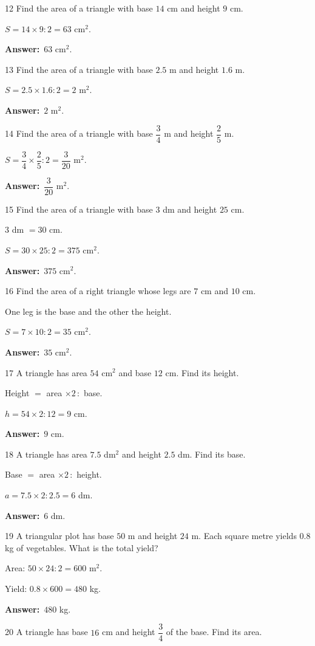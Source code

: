 \documentclass[11pt]{article}
\newif\ifsol \solfalse
\providecommand{\AnsWord}{Đáp số}
\newcommand{\dapso}[1]{\par\textbf{\AnsWord:}\ #1}
\newcommand{\probsol}[1]{%
  \begin{lrbox}{\solmeasure}\begin{minipage}{\dimexpr\linewidth-24pt\relax}#1\end{minipage}\end{lrbox}%
  \ifsol
    \begin{solbox}#1\end{solbox}%
  \else
    \setlength{\solht}{\dimexpr\ht\solmeasure+\dp\solmeasure+0.85cm\relax}%
    \ifdim\solht<1.35cm\setlength{\solht}{1.35cm}\fi
    \begin{tcolorbox}[colback=white,colframe=Line,boxrule=0.8pt,arc=5pt,
      left=8pt,right=8pt,top=4pt,bottom=4pt,height=\solht]{\footnotesize\color{Slate}\itshape\WorkWord}\end{tcolorbox}%
  \fi}
\newcommand{\gap}{\vspace{0.3cm}}
\def\WorkWord{Your work:}
\def\AnsWord{Answer}
\begin{document}
\gap
\begin{probbox}{12}{\relax}
Find the area of a triangle with base $14$ cm and height $9$ cm.
\end{probbox}
\probsol{
$S=14\times9:2=63$ cm$^2$.
\dapso{$63$ cm$^2$.}}
\gap
\begin{probbox}{13}{\relax}
Find the area of a triangle with base $2.5$ m and height $1.6$ m.
\end{probbox}
\probsol{
$S=2.5\times1.6:2=2$ m$^2$.
\dapso{$2$ m$^2$.}}
\gap
\begin{probbox}{14}{\relax}
Find the area of a triangle with base $\dfrac34$ m and height $\dfrac25$ m.
\end{probbox}
\probsol{
$S=\dfrac34\times\dfrac25:2=\dfrac3{20}$ m$^2$.
\dapso{$\dfrac3{20}$ m$^2$.}}
\gap
\begin{probbox}{15}{\relax}
Find the area of a triangle with base $3$ dm and height $25$ cm.
\end{probbox}
\probsol{
$3$ dm $=30$ cm.\par $S=30\times25:2=375$ cm$^2$.
\dapso{$375$ cm$^2$.}}
\gap
\begin{probbox}{16}{\relax}
Find the area of a right triangle whose legs are $7$ cm and $10$ cm.
\end{probbox}
\probsol{
One leg is the base and the other the height.\par $S=7\times10:2=35$ cm$^2$.
\dapso{$35$ cm$^2$.}}
\gap
\begin{probbox}{17}{\relax}
A triangle has area $54$ cm$^2$ and base $12$ cm. Find its height.
\end{probbox}
\probsol{
Height $=$ area $\times2\,:$ base.\par $h=54\times2:12=9$ cm.
\dapso{$9$ cm.}}
\gap
\begin{probbox}{18}{\relax}
A triangle has area $7.5$ dm$^2$ and height $2.5$ dm. Find its base.
\end{probbox}
\probsol{
Base $=$ area $\times2\,:$ height.\par $a=7.5\times2:2.5=6$ dm.
\dapso{$6$ dm.}}
\gap
\begin{probbox}{19}{\relax}
A triangular plot has base $50$ m and height $24$ m. Each square metre yields $0.8$ kg of vegetables. What is the total yield?
\end{probbox}
\probsol{
Area: $50\times24:2=600$ m$^2$.\par Yield: $0.8\times600=480$ kg.
\dapso{$480$ kg.}}
\gap
\begin{probbox}{20}{\relax}
A triangle has base $16$ cm and height $\dfrac34$ of the base. Find its area.
\end{probbox}
\end{document}
